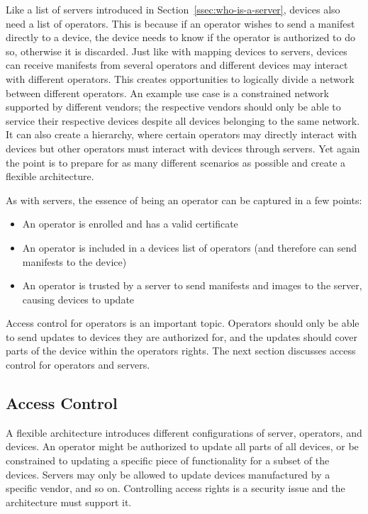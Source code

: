 \documentclass[0-thesis.tex]{subfiles}
\begin{document}
Like a list of servers introduced in Section~\ref{ssec:who-is-a-server}, devices also need
a list of operators. This is because if an operator wishes to send a manifest directly to
a device, the device needs to know if the operator is authorized to do so, otherwise it is
discarded. Just like with mapping devices to servers, devices can receive manifests from
several operators and different devices may interact with different operators. This
creates opportunities to logically divide a network between different operators. An
example use case is a constrained network supported by different vendors; the respective
vendors should only be able to service their respective devices despite all devices
belonging to the same network. It can also create a hierarchy, where certain operators may
directly interact with devices but other operators must interact with devices through
servers. Yet again the point is to prepare for as many different scenarios as possible and
create a flexible architecture.

As with servers, the essence of being an operator can be captured in a few points:

\begin{itemize}
    \item An operator is enrolled and has a valid certificate
    \item An operator is included in a devices list of operators (and therefore can send
            manifests to the device)
    \item An operator is trusted by a server to send manifests and images to the server,
            causing devices to update
\end{itemize}

Access control for operators is an important topic. Operators should only be able to send
updates to devices they are authorized for, and the updates should cover parts of the
device within the operators rights. The next section discusses access control for
operators and servers.

\subsection{Access Control}
\label{ssec:access-control}
A flexible architecture introduces different configurations of server, operators, and
devices. An operator might be authorized to update all parts of all devices, or be
constrained to updating a specific piece of functionality for a subset of the devices.
Servers may only be allowed to update devices manufactured by a specific vendor, and so
on. Controlling access rights is a security issue and the architecture must support it.
\end{document}
